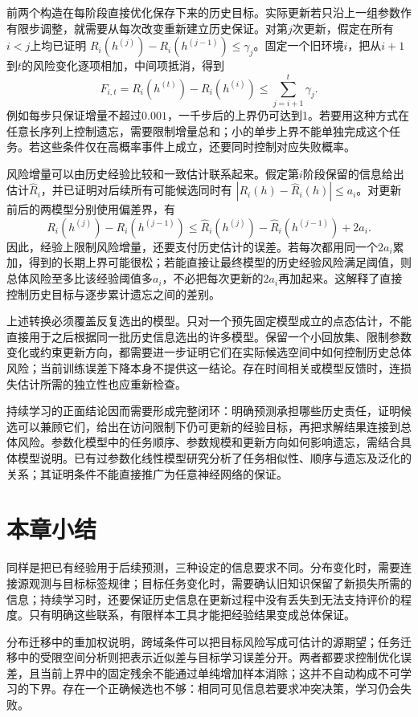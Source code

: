 前两个构造在每阶段直接优化保存下来的历史目标。实际更新若只沿上一组参数作有限步调整，就需要从每次改变重新建立历史保证。对第$j$次更新，假定在所有$i<j$上均已证明
$R_i(h^{(j)})-R_i(h^{(j-1)})\leq\gamma_j$。固定一个旧环境$i$，把从$i+1$到$t$的风险变化逐项相加，中间项抵消，得到
\[
 F_{i,t}=R_i(h^{(t)})-R_i(h^{(i)})
       \leq\sum_{j=i+1}^t\gamma_j.
\]
例如每步只保证增量不超过$0.001$，一千步后的上界仍可达到1。若要用这种方式在任意长序列上控制遗忘，需要限制增量总和；小的单步上界不能单独完成这个任务。若这些条件仅在高概率事件上成立，还要同时控制对应失败概率。

风险增量可以由历史经验比较和一致估计联系起来。假定第$i$阶段保留的信息给出估计$\widehat R_i$，并已证明对后续所有可能候选同时有
$|R_i(h)-\widehat R_i(h)|\leq a_i$。对更新前后的两模型分别使用偏差界，有
\[
 R_i(h^{(j)})-R_i(h^{(j-1)})
 \leq\widehat R_i(h^{(j)})-\widehat R_i(h^{(j-1)})+2a_i.
\]
因此，经验上限制风险增量，还要支付历史估计的误差。若每次都用同一个$2a_i$累加，得到的长期上界可能很松；若能直接让最终模型的历史经验风险满足阈值，则总体风险至多比该经验阈值多$a_i$，不必把每次更新的$2a_i$再加起来。这解释了直接控制历史目标与逐步累计遗忘之间的差别。

上述转换必须覆盖反复选出的模型。只对一个预先固定模型成立的点态估计，不能直接用于之后根据同一批历史信息选出的许多模型。保留一个小回放集、限制参数变化或约束更新方向，都需要进一步证明它们在实际候选空间中如何控制历史总体风险；当前训练误差下降本身不提供这一结论。存在时间相关或模型反馈时，连损失估计所需的独立性也应重新检查。

持续学习的正面结论因而需要形成完整闭环：明确预测承担哪些历史责任，证明候选可以兼顾它们，给出在访问限制下仍可更新的经验目标，再把求解结果连接到总体风险。参数化模型中的任务顺序、参数规模和更新方向如何影响遗忘，需结合具体模型说明。已有过参数化线性模型研究分析了任务相似性、顺序与遗忘及泛化的关系；其证明条件不能直接推广为任意神经网络的保证。
\section{本章小结}
\label{sec:transfer-learning-summary}

同样是把已有经验用于后续预测，三种设定的信息要求不同。分布变化时，需要连接源观测与目标标签规律；目标任务变化时，需要确认旧知识保留了新损失所需的信息；持续学习时，还要保证历史信息在更新过程中没有丢失到无法支持评价的程度。只有明确这些联系，有限样本工具才能把经验结果变成总体保证。

分布迁移中的重加权说明，跨域条件可以把目标风险写成可估计的源期望；任务迁移中的受限空间分析则把表示近似差与目标学习误差分开。两者都要求控制优化误差，且当前上界中的固定残余不能通过单纯增加样本消除；这并不自动构成不可学习的下界。存在一个正确候选也不够：相同可见信息若要求冲突决策，学习仍会失败。

